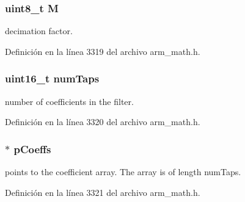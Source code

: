 \subsubsection[{\texorpdfstring{M}{M}}]{\setlength{\rightskip}{0pt plus 5cm}uint8\+\_\+t M}\hypertarget{structarm__fir__decimate__instance__q15_ae2c8107d00d3c9942e7a20fc598edecf}{}\label{structarm__fir__decimate__instance__q15_ae2c8107d00d3c9942e7a20fc598edecf}
decimation factor. 

Definición en la línea 3319 del archivo arm\+\_\+math.\+h.

\subsubsection[{\texorpdfstring{num\+Taps}{numTaps}}]{\setlength{\rightskip}{0pt plus 5cm}uint16\+\_\+t num\+Taps}\hypertarget{structarm__fir__decimate__instance__q15_a751941891e47f522a7f5375fe8990aac}{}\label{structarm__fir__decimate__instance__q15_a751941891e47f522a7f5375fe8990aac}
number of coefficients in the filter. 

Definición en la línea 3320 del archivo arm\+\_\+math.\+h.

\subsubsection[{\texorpdfstring{p\+Coeffs}{pCoeffs}}]{$\ast$ p\+Coeffs}\hypertarget{structarm__fir__decimate__instance__q15_a7ca181a37f714d174445f486bebce26f}{}\label{structarm__fir__decimate__instance__q15_a7ca181a37f714d174445f486bebce26f}
points to the coefficient array. The array is of length num\+Taps. 

Definición en la línea 3321 del archivo arm\+\_\+math.\+h.

